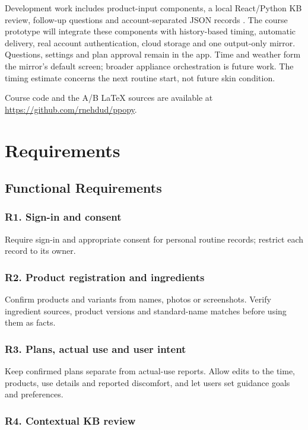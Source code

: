 \documentclass[conference,letterpaper]{IEEEtran}
\begin{document}
Development work includes product-input components, a local React/Python KB review, follow-up questions and account-separated JSON records \cite{ref3}. The course prototype will integrate these components with history-based timing, automatic delivery, real account authentication, cloud storage and one output-only mirror. Questions, settings and plan approval remain in the app. Time and weather form the mirror's default screen; broader appliance orchestration is future work. The timing estimate concerns the next routine start, not future skin condition.

Course code and the A/B LaTeX sources are available at \url{https://github.com/rnehdud/ppopy}.

\section{Requirements}

\subsection{Functional Requirements}

\subsubsection*{R1. Sign-in and consent}

Require sign-in and appropriate consent for personal routine records; restrict each record to its owner.

\subsubsection*{R2. Product registration and ingredients}

Confirm products and variants from names, photos or screenshots. Verify ingredient sources, product versions and standard-name matches before using them as facts.

\subsubsection*{R3. Plans, actual use and user intent}

Keep confirmed plans separate from actual-use reports. Allow edits to the time, products, use details and reported discomfort, and let users set guidance goals and preferences.

\subsubsection*{R4. Contextual KB review}
\end{document}
